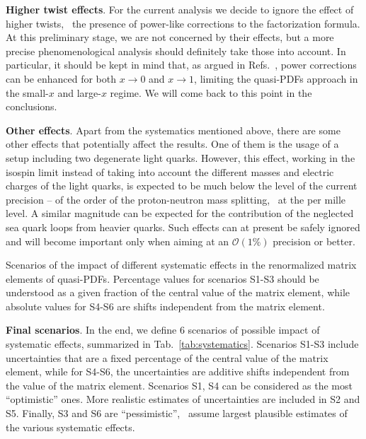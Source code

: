 \textbf{Higher twist effects}. For the current analysis we decide to ignore the
effect of higher twists, \ie\ the presence of power-like corrections to the
factorization formula. At this preliminary stage, we are not concerned by their
effects, but a more precise phenomenological analysis should definitely take
those into account. In particular, it should be kept in mind that, as argued in Refs.~\cite{Izubuchi:2018srq, Braun:2018brg},
power corrections can be enhanced for both $x\rightarrow 0$ and $x\rightarrow 1$, limiting
the quasi-PDFs approach in the small-$x$ and large-$x$ regime. We will come back to this point in the conclusions. 

\textbf{Other effects}. Apart from the systematics mentioned above, there are
some other effects that potentially affect the results. One of them is the usage
of a setup including two degenerate light quarks. However, this effect, working
in the isospin limit instead of taking into account the different masses and
electric charges of the light quarks, is expected to be much below the level of
the current precision -- of the order of the proton-neutron mass splitting, \ie\
at the per mille level. A similar magnitude can be expected for the contribution
of the neglected sea quark loops from heavier quarks. Such effects can at
present be safely ignored and will become important only when aiming at an
$\mathcal{O}(1\%)$ precision or better.


\begin{table}[!t]
    \centering
    \scriptsize
    \renewcommand{\arraystretch}{1.90}
    
    \vspace{0.3cm}
    \caption{Scenarios of the impact of different systematic effects 
    in the renormalized matrix elements of quasi-PDFs. Percentage values for scenarios 
    S1-S3 should be understood as a given fraction of the central value of the matrix element, 
    while absolute values for S4-S6 are shifts independent from the matrix element.}
    \label{tab:systematics}
\end{table}


\textbf{Final scenarios}. In the end, we define 6 scenarios of possible impact
of systematic effects, summarized in Tab.~\ref{tab:systematics}. Scenarios S1-S3
include uncer\-tain\-ties that are a fixed percentage of the central value of
the matrix element, while for S4-S6, the uncertainties are additive shifts
independent from the value of the matrix element. Scenarios S1, S4 can be
considered as the most ``optimistic'' ones. More realistic estimates of
uncertainties are included in S2 and S5. Finally, S3 and S6 are ``pessimistic'',
\ie\ assume largest plausible estimates of the various systematic effects.


